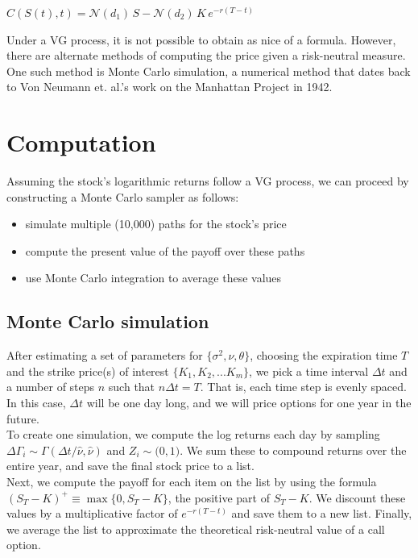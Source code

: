 \documentclass[twoside]{article}
\begin{document}
\begin{multicols}{2}
\begin{center}{
$C(S(t), t) = \mathcal{N}(d_1) \, S - \mathcal{N}(d_2) \, K \, e^{-r (T-t)}$
}\end{center}

Under a VG process, it is not possible to obtain as nice of a formula. However, there are alternate methods of computing the price given a risk-neutral measure. One such method is Monte Carlo simulation, a numerical method that dates back to Von Neumann et. al.'s work on the Manhattan Project in 1942.

\section{Computation}

Assuming the stock's logarithmic returns follow a VG process, we can proceed by constructing a Monte Carlo sampler as follows:
\begin{itemize}
\item simulate multiple (10,000) paths for the stock's price
\item compute the present value of the payoff over these paths
\item use Monte Carlo integration to average these values
\end{itemize}

\subsection{Monte Carlo simulation}
After estimating a set of parameters for $\{\sigma^2, \nu, \theta\}$, choosing the expiration time $T$ and the strike price(s) of interest $\{K_1, K_2, ... K_m\}$, we pick a time interval $\Delta t$ and a number of steps $n$ such that $n \Delta t = T$. That is, each time step is evenly spaced. In this case, $\Delta t$ will be one day long, and we will price options for one year in the future. \\

To create one simulation, we compute the log returns each day by sampling $\Delta \Gamma_i \sim \Gamma(\Delta t/\hat{\nu}, \hat{\nu})$ and $Z_i \sim \mathcal(0,1)$. We sum these to compound returns over the entire year, and save the final stock price to a list. \\

Next, we compute the payoff for each item on the list by using the formula $(S_T - K)^+ \equiv \max\{0, S_T - K\} $, the positive part of $S_T - K$. We discount these values by a multiplicative factor of $e^{-r(T-t)}$ and save them to a new list. Finally, we average the list to approximate the theoretical risk-neutral value of a call option.


\end{multicols}
\end{document}
